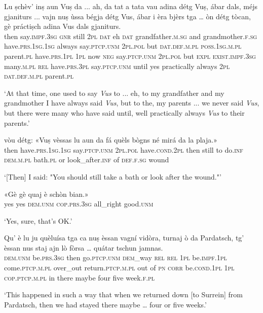 \clearpage

\begin{linenumbers}
\gll  Lu ṣchèv’ inṣ aun Vuṣ da ... ah, da tat a tata vau adina détg Vuṣ, ábar dals, méjs gjaniturs ... vajn nuṣ ùssa bégja détg Vus, ábar i èra bjèrs tga … òn détg tòcan, gè práctiṣch adina Vus dals gjaniturs.  \\
then say.\textsc{impf.3sg} \textsc{gnr} still  \textsc{2pl} \textsc{dat} {} eh \textsc{dat} grandfather.\textsc{m.sg} and grandmother.\textsc{f.sg} have.\textsc{prs.1sg.1sg} always say.\textsc{ptcp.unm} \textsc{2pl.pol} but \textsc{dat.def.m.pl} \textsc{poss.1sg.m.pl} parent.\textsc{pl} {} have.\textsc{prs.1pl} \textsc{1pl} now \textsc{neg} say.\textsc{ptcp.unm} \textsc{2pl.pol} but \textsc{expl} \textsc{exist.impf.3sg} many.\textsc{m.pl} \textsc{rel} {} have.\textsc{prs.3pl} say.\textsc{ptcp.unm} until yes practically always \textsc{2pl} \textsc{dat.def.m.pl} parent.\textsc{pl}\\
\end{linenumbers}
\medskip
\glt `At that time, one used to say \textit{Vus} to ... eh, to my grandfather and my grandmother I have always said \textit{Vus}, but to the, my parents ... we never said \textit{Vus}, but there were many who have said until, well practically always \textit{Vus} to their parents.'
\medskip

\begin{linenumbers}
\gll  [Lu] vòu détg:  «Vuṣ vèssas lu aun da fá quèls bògns né mirá da la plaja.»  \\
then have.\textsc{prs.1sg.1sg} say.\textsc{ptcp.unm} \textsc{2pl.pol}  have.\textsc{cond.2pl} then still to  do.\textsc{inf} \textsc{dem.m.pl} bath.\textsc{pl} or look\_after.\textsc{inf} of \textsc{def.f.sg} wound\\
\end{linenumbers}
\medskip
\glt `[Then] I said: "You should still take a bath or look after the wound."'
\medskip

\begin{linenumbers}
\gll  «Gè gè quaj è schòn bian.»  \\
yes yes \textsc{dem.unm} \textsc{cop.prs.3sg} all\_right good.\textsc{unm}  \\
\end{linenumbers}
\medskip
\glt `Yes, sure, that’s OK.'
\medskip

\begin{linenumbers}
\gll  Qu' è lu ju quèluísa tga ca nuṣ èssan vagní vidòra, turnaj ò da Pardatsch, tg' èssan nus staj ajn lò fòrsa … quátar tschun jamnas.  \\
 \textsc{dem.unm} be.\textsc{prs.3sg} then go.\textsc{ptcp.unm} \textsc{dem}\_way \textsc{rel} \textsc{rel} \textsc{1pl} be.\textsc{impf.1pl} come.\textsc{ptcp.m.pl} over\_out return.\textsc{ptcp.m.pl} out of \textsc{pn} \textsc{corr} be.\textsc{cond.1pl} \textsc{1pl} \textsc{cop.ptcp.m.pl} in there maybe {} four five week.\textsc{f.pl}   \\
\end{linenumbers}
\medskip
\glt `This happened in such a way that when we returned down [to Surrein] from Pardatsch, then we had stayed there maybe … four or five weeks.'
\medskip

